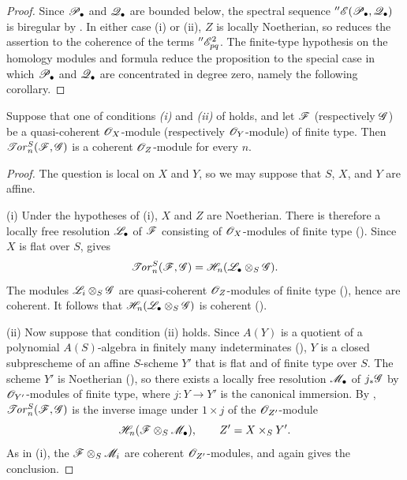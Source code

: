 \begin{proof}
Since $\mathscr{P}_\bullet$ and $\mathscr{Q}_\bullet$ are bounded below, the
spectral sequence
$''\mathscr{E}(\mathscr{P}_\bullet,\mathscr{Q}_\bullet)$ is biregular by
.  In either case (i) or (ii), $Z$ is locally
Noetherian, so  reduces the assertion to the
coherence of the terms $''\mathscr{E}_{pq}^2$.  The finite-type
hypothesis on the homology modules and formula
 reduce the proposition to the special case in
which $\mathscr{P}_\bullet$ and $\mathscr{Q}_\bullet$ are concentrated in
degree zero, namely the following corollary.
\end{proof}

\begin{corollary}[6.5.14]
\label{III.6.5.14}
Suppose that one of conditions \emph{(i)} and \emph{(ii)} of
 holds, and let $\mathscr{F}$ (respectively $\mathscr{G}$)
be a quasi-coherent $\mathscr{O}_X$-module (respectively
$\mathscr{O}_Y$-module) of finite type.  Then
$\mathscr{T}\!\mathit{or}_n^S(\mathscr{F},\mathscr{G})$ is a coherent $\mathscr{O}_Z$-module for
every $n$.
\end{corollary}

\begin{proof}
The question is local on $X$ and $Y$, so we may suppose that
$S$, $X$, and $Y$ are affine.

\textnormal{(i)} Under the hypotheses of (i), $X$ and $Z$
are Noetherian.  There is therefore a locally free resolution
$\mathscr{L}_\bullet$ of $\mathscr{F}$ consisting of $\mathscr{O}_X$-modules of
finite type ().  Since $X$ is flat over $S$,
 gives
\[
  \mathscr{T}\!\mathit{or}_n^S(\mathscr{F},\mathscr{G})
  =
  \mathscr{H}_n(\mathscr{L}_\bullet\otimes_S\mathscr{G}).
\]
The modules $\mathscr{L}_i\otimes_S\mathscr{G}$ are quasi-coherent
$\mathscr{O}_Z$-modules of finite type (), hence are
coherent.  It follows that
$\mathscr{H}_n(\mathscr{L}_\bullet\otimes_S\mathscr{G})$ is coherent
().

\textnormal{(ii)} Now suppose that condition (ii) holds.  Since
$A(Y)$ is a quotient of a polynomial $A(S)$-algebra in finitely
many indeterminates (), $Y$ is a closed
subprescheme of an affine $S$-scheme $Y'$ that is flat and of
finite type over $S$.  The scheme $Y'$ is Noetherian
(), so there exists a locally free resolution
$\mathscr{M}_\bullet$ of $j_*\mathscr{G}$ by $\mathscr{O}_{Y'}$-modules of finite
type, where $j:Y\to Y'$ is the canonical immersion.  By
, $\mathscr{T}\!\mathit{or}_n^S(\mathscr{F},\mathscr{G})$ is the inverse image
under $1\times j$ of the $\mathscr{O}_{Z'}$-module
\[
  \mathscr{H}_n(\mathscr{F}\otimes_S\mathscr{M}_\bullet),
  \qquad Z'=X\times_SY'.
\]
As in (i), the $\mathscr{F}\otimes_S\mathscr{M}_i$ are coherent
$\mathscr{O}_{Z'}$-modules, and  again gives the
conclusion.
\end{proof}

